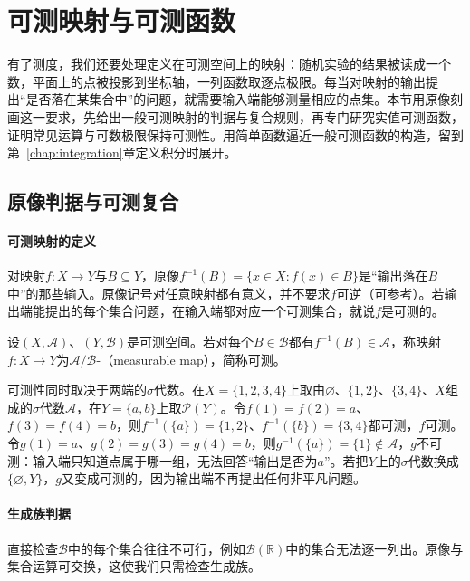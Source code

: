 \section{可测映射与可测函数}
\label{sec:measure-measurable-maps}

有了测度，我们还要处理定义在可测空间上的映射：随机实验的结果被读成一个数，平面上的点被投影到坐标轴，一列函数取逐点极限。每当对映射的输出提出“是否落在某集合中”的问题，就需要输入端能够测量相应的点集。本节用原像刻画这一要求，先给出一般可测映射的判据与复合规则，再专门研究实值可测函数，证明常见运算与可数极限保持可测性。用简单函数逼近一般可测函数的构造，留到第~\ref{chap:integration}章定义积分时展开。

\subsection{原像判据与可测复合}
\label{sec:measure-preimage-criterion}

\paragraph{可测映射的定义}
对映射$f:X\to Y$与$B\subseteq Y$，原像$f^{-1}(B)=\{x\in X:f(x)\in B\}$是“输出落在$B$中”的那些输入。原像记号对任意映射都有意义，并不要求$f$可逆（可参考）。若输出端能提出的每个集合问题，在输入端都对应一个可测集合，就说$f$是可测的。

\begin{definition}[可测映射]
\label{def:measure-measurable-map}
设$(X,\mathcal A)$、$(Y,\mathcal B)$是可测空间。若对每个$B\in\mathcal B$都有$f^{-1}(B)\in\mathcal A$，称映射$f:X\to Y$为$\mathcal A/\mathcal B$-（measurable map），简称可测。
\end{definition}

可测性同时取决于两端的$\sigma$代数。在$X=\{1,2,3,4\}$上取由$\varnothing$、$\{1,2\}$、$\{3,4\}$、$X$组成的$\sigma$代数$\mathcal A$，在$Y=\{a,b\}$上取$\mathcal P(Y)$。令$f(1)=f(2)=a$、$f(3)=f(4)=b$，则$f^{-1}(\{a\})=\{1,2\}$、$f^{-1}(\{b\})=\{3,4\}$都可测，$f$可测。令$g(1)=a$、$g(2)=g(3)=g(4)=b$，则$g^{-1}(\{a\})=\{1\}\notin\mathcal A$，$g$不可测：输入端只知道点属于哪一组，无法回答“输出是否为$a$”。若把$Y$上的$\sigma$代数换成$\{\varnothing,Y\}$，$g$又变成可测的，因为输出端不再提出任何非平凡问题。

\paragraph{生成族判据}
直接检查$\mathcal B$中的每个集合往往不可行，例如$\mathcal B(\mathbb R)$中的集合无法逐一列出。原像与集合运算可交换，这使我们只需检查生成族。

